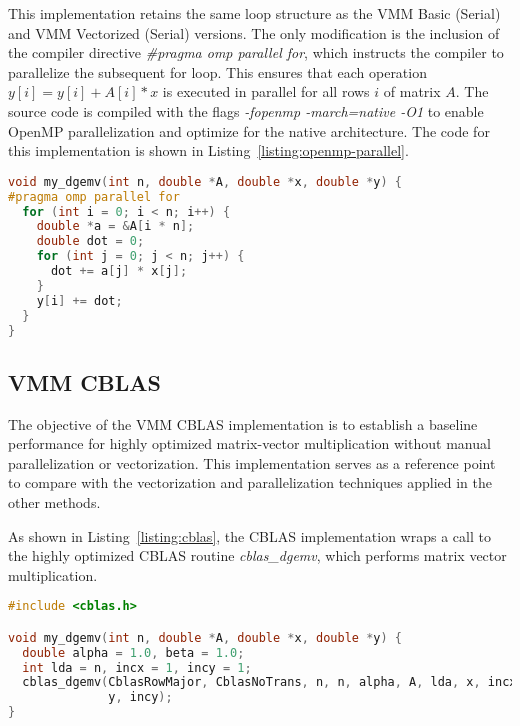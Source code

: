 This implementation retains the same loop structure as the VMM Basic (Serial) and VMM Vectorized (Serial) versions. The only modification is the inclusion of the compiler directive \textit{\#pragma omp parallel for}, which instructs the compiler to parallelize the subsequent for loop. This ensures that each operation \( y[i] = y[i] + A[i] * x \) is executed in parallel for all rows \(i\) of matrix \(A\). The source code is compiled with the flags \textit{-fopenmp -march=native -O1} to enable OpenMP parallelization and optimize for the native architecture. The code for this implementation is shown in Listing~\ref{listing:openmp-parallel}.


\begin{lstlisting}[caption={\textbf{OpenMP-parallel implementation for matrix-vector multiplication.} This implementation retains the loop structure of the VMM Basic (Serial) and VMM Vectorized (Serial) versions, with the addition of the \texttt{\#pragma omp parallel for} directive to enable parallel execution across multiple threads.},label={listing:openmp-parallel},name=openmp-parallel,float=htbp,style=mystyle,language=C++]
void my_dgemv(int n, double *A, double *x, double *y) {
#pragma omp parallel for
  for (int i = 0; i < n; i++) {
    double *a = &A[i * n];
    double dot = 0;
    for (int j = 0; j < n; j++) {
      dot += a[j] * x[j];
    }
    y[i] += dot;
  }
}
\end{lstlisting}

\subsection{VMM CBLAS}
\label{subsec:vmm-cblas}

The objective of the VMM CBLAS implementation is to establish a baseline performance for highly optimized matrix-vector multiplication without manual parallelization or vectorization. This implementation serves as a reference point to compare with the vectorization and parallelization techniques applied in the other methods.

As shown in Listing~\ref{listing:cblas}, the CBLAS implementation wraps a call to the highly optimized CBLAS routine \textit{cblas\_dgemv}, which performs matrix vector multiplication.

\begin{lstlisting}[caption={CBLAS implementation using the cblas\_dgemv routine for optimized matrix vector multiplication},label={listing:cblas},name=cblas,float=htbp,style=mystyle,language=C++]
#include <cblas.h>

void my_dgemv(int n, double *A, double *x, double *y) {
  double alpha = 1.0, beta = 1.0;
  int lda = n, incx = 1, incy = 1;
  cblas_dgemv(CblasRowMajor, CblasNoTrans, n, n, alpha, A, lda, x, incx, beta,
              y, incy);
}
\end{lstlisting}
